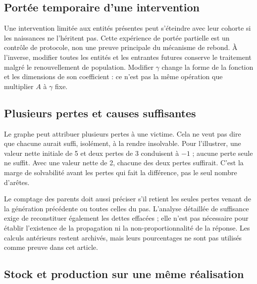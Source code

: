 \subsection{Portée temporaire d'une intervention}
Une intervention limitée aux entités présentes peut s'éteindre
avec leur cohorte si les naissances ne l'héritent pas. Cette
expérience de portée partielle est un contrôle de protocole,
non une preuve principale du mécanisme de rebond. À l'inverse,
modifier toutes les entités et les entrantes futures conserve
le traitement malgré le renouvellement de population. Modifier
$\gamma$ change la forme de la fonction et les dimensions de
son coefficient : ce n'est pas la même opération que multiplier
$A$ à $\gamma$ fixe.

\subsection{Plusieurs pertes et causes suffisantes}
Le graphe peut attribuer plusieurs pertes à une victime.
Cela ne veut pas dire que chacune aurait suffi, isolément, à
la rendre insolvable. Pour l'illustrer, une valeur nette initiale
de 5 et deux pertes de 3 conduisent à $-1$ ; aucune perte seule
ne suffit. Avec une valeur nette de 2, chacune des deux pertes
suffirait. C'est la marge de solvabilité avant les pertes qui
fait la différence, pas le seul nombre d'arêtes.

Le comptage des parents doit aussi préciser s'il retient les
seules pertes venant de la génération précédente ou toutes
celles du pas. L'analyse détaillée de suffisance exige de
reconstituer également les dettes effacées ; elle n'est pas
nécessaire pour établir l'existence de la propagation ni la
non-proportionnalité de la réponse. Les calculs antérieurs
restent archivés, mais leurs pourcentages ne sont pas utilisés
comme preuve dans cet article.

\subsection{Stock et production sur une même réalisation}

